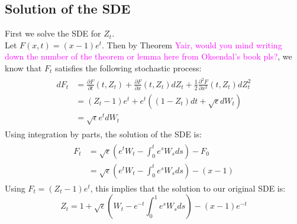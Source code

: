 \documentclass[11pt]{amsart}
\newcommand{\kknote}[1]{{\textcolor{magenta}{#1}}}
\begin{document}
\subsection{Solution of the SDE}
First we solve the SDE for $Z_t$. 
\\
Let $F(x,t) = (x-1)e^t$. Then by Theorem \kknote{Yair, would you mind writing down the number of the theorem or lemma here from Oksendal's book pls?}, we know that $F_t$ satisfies the following stochastic process: 
\begin{align}
  \begin{split}
  dF_t &= \frac{\partial{F}}{\partial t}(t,Z_t)+\frac{\partial{F}}{\partial{x}}(t,Z_t)dZ_t+\frac{1}{2}\frac{\partial^2F}{\partial{x}^2}(t,Z_t)dZ_t^2 \\ 
       &= (Z_t-1)e^t+e^t\left( (1-Z_t)dt+\sqrt{\epsilon}dW_t \right) \\
       &= \sqrt{\epsilon}e^tdW_t
  \end{split}
\end{align}
Using integration by parts, the solution of the SDE is: 
\begin{align}
  \begin{split}
F_t &= \sqrt{\epsilon}(e^tW_t-\int_{0}^{t}e^sW_sds)-F_0 \\
%
%  
   &= \sqrt{\epsilon}(e^tW_t-\int_{0}^{t}e^sW_sds)-(x-1)
\end{split}
\end{align}
Using $F_t = (Z_t-1)e^t$, this implies that the solution to our original SDE is: 
\begin{equation}
Z_t = 1+\sqrt{\epsilon}(W_t-e^{-t}\int_{0}^{1}e^sW_sds)-(x-1)e^{-t}
\end{equation}


\end{document}
